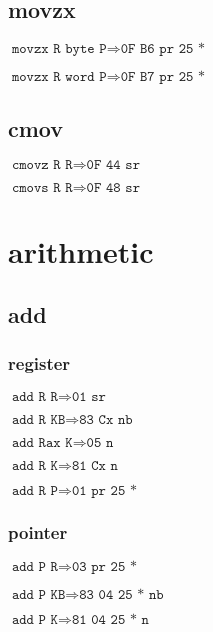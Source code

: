 \documentclass{article}
\begin{document}
\subsection{movzx}

\begin{minipage}{\textwidth}

$\texttt{movzx R byte P} \Rightarrow \texttt{0F B6 pr 25 *}$

$\texttt{movzx R word P} \Rightarrow \texttt{0F B7 pr 25 *}$

\end{minipage}


\subsection{cmov}

\begin{minipage}{\textwidth}

$\texttt{cmovz R R} \Rightarrow \texttt{0F 44 sr}$

$\texttt{cmovs R R} \Rightarrow \texttt{0F 48 sr}$

\end{minipage}



\section{arithmetic}

\subsection{add}
\begin{minipage}{\textwidth}

\subsubsection{register}

$\texttt{add R R} \Rightarrow \texttt{01 sr}$

$\texttt{add R KB} \Rightarrow \texttt{83 Cx nb}$

$\texttt{add Rax K} \Rightarrow \texttt{05 n}$

$\texttt{add R K} \Rightarrow \texttt{81 Cx n}$

$\texttt{add R P} \Rightarrow \texttt{01 pr 25 *}$


\subsubsection{pointer}

$\texttt{add P R} \Rightarrow \texttt{03 pr 25 *}$

$\texttt{add P KB} \Rightarrow \texttt{83 04 25 * nb}$

$\texttt{add P K} \Rightarrow \texttt{81 04 25 * n}$

\end{minipage}
\end{document}
